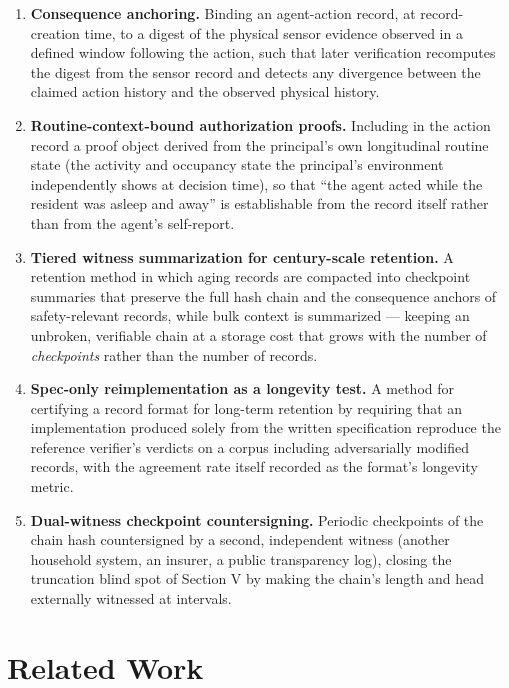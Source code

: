 \documentclass[journal]{IEEEtran}
\begin{document}
\begin{enumerate}
\item \textbf{Consequence anchoring.} Binding an agent-action record,
at record-creation time, to a digest of the physical sensor evidence
observed in a defined window following the action, such that later
verification recomputes the digest from the sensor record and detects
any divergence between the claimed action history and the observed
physical history.

\item \textbf{Routine-context-bound authorization proofs.} Including
in the action record a proof object derived from the principal's own
longitudinal routine state (the activity and occupancy state the
principal's environment independently shows at decision time), so that
``the agent acted while the resident was asleep and away'' is
establishable from the record itself rather than from the agent's
self-report.

\item \textbf{Tiered witness summarization for century-scale
retention.} A retention method in which aging records are compacted
into checkpoint summaries that preserve the full hash chain and the
consequence anchors of safety-relevant records, while bulk context is
summarized --- keeping an unbroken, verifiable chain at a storage cost
that grows with the number of \emph{checkpoints} rather than the
number of records.

\item \textbf{Spec-only reimplementation as a longevity test.} A
method for certifying a record format for long-term retention by
requiring that an implementation produced solely from the written
specification reproduce the reference verifier's verdicts on a corpus
including adversarially modified records, with the agreement rate
itself recorded as the format's longevity metric.

\item \textbf{Dual-witness checkpoint countersigning.} Periodic
checkpoints of the chain hash countersigned by a second, independent
witness (another household system, an insurer, a public transparency
log), closing the truncation blind spot of Section V by making the
chain's length and head externally witnessed at intervals.
\end{enumerate}

\section{Related Work}
\end{document}
